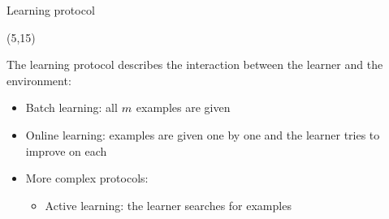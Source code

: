 \begin{frame}{Learning protocol}

  \begin{textblock}{90}(5,15)
    \begin{block}{}
      The learning protocol describes the interaction between the learner and the
      environment:
      \begin{itemize}
      \item<2-> Batch learning: all $m$ examples are given
      \item<3-> Online learning: examples are given one by one and the learner
        tries to improve on each
      \item<4-> More complex protocols:
        \begin{itemize}
        \item Active learning: the learner searches for examples
        \end{itemize}
      \end{itemize}
    \end{block}
  \end{textblock}
\end{frame}


